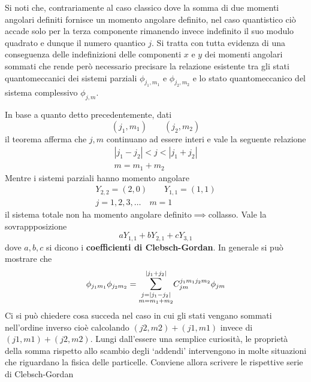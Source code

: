 Si noti che, contrariamente al caso classico dove la somma di due
momenti angolari definiti fornisce un momento angolare definito, nel
caso quantistico ciò accade solo per la terza componente rimanendo
invece indefinito il suo modulo quadrato e dunque il numero quantico
\(j\).
Si tratta con tutta evidenza di una conseguenza delle
indefinizioni delle componenti \(x\) e \(y\) dei momenti angolari
sommati che rende però necessario precisare la relazione esistente tra
gli stati quantomeccanici dei sistemi parziali \(\phi_{j_1, m_1}\) e
\(\phi_{j_2,m_2}\) e lo stato quantomeccanico del sistema complessivo
\(\phi_{j,m}\).

In base a quanto detto precedentemente, dati \[
                                                 (j_{1},m_{1}) \qquad (j_{2},m_{2})
\]
il teorema afferma che \(j,m\) continuano ad essere interi e vale la
seguente relazione \begin{gather*}
                       | j_{1} - j_{2}| < j < | j_{1} + j_{2} |\\
                       m = m_{1} + m_{2}
\end{gather*}
Mentre i sistemi parziali hanno momento angolare \begin{gather*}
                                                     Y_{2,2}=(2,0) \qquad Y_{1,1}=(1,1)\\
                                                     j = 1,2,3, \dots \quad m = 1
\end{gather*}
il sistema totale non ha momento angolare definito\(\implies\)collasso.
Vale la sovrappposizione \[
                             a Y_{1,1}+bY_{2,1}+cY_{3,1}
\] dove \(a,b,c\) si dicono i \textbf{coefficienti di Clebsch-Gordan}.
In generale si può mostrare che
\[
    \phi_{j_{1}m_{1}} \phi_{j_{2}m_{2}} = \mathlarger{\sum}_{\substack{j=| j_{1}-j_{2}| \\ m = m_{1}+m_{2}} }^{| j_{1}+j_{2}|} C_{jm}^{j_{1}m_{1}j_{2}m_{2}} \phi_{jm}
\]
Ci si può chiedere cosa succeda nel caso in cui gli stati vengano sommati nell’ordine inverso cioè calcolando
$(j2, m2) + (j1, m1)$ invece di $(j1, m1) + (j2, m2)$.
Lungi dall’essere una semplice curiosità, le proprietà della somma rispetto allo scambio degli ‘addendi’ intervengono in molte situazioni che
riguardano la fisica delle particelle.
Conviene allora scrivere le rispettive serie di Clebsch-Gordan
